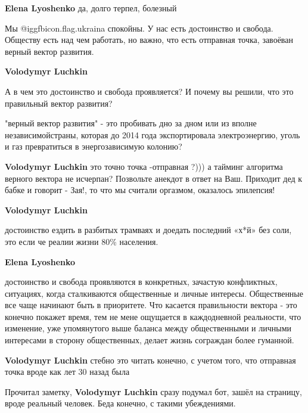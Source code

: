 \begin{itemize}
\begin{itemize}
\textbf{Elena Lyoshenko} да, долго терпел, болезный
\end{itemize} %


Мы @igg{fbicon.flag.ukraina} спокойны. У нас есть достоинство и свобода. Обществу есть над чем
работать, но важно, что есть отправная точка, завоёван верный вектор развития.

\begin{itemize} %

\textbf{Volodymyr Luchkin}

А в чем это достоинство и свобода проявляется? И почему вы решили, что это
правильный вектор развития?


"верный вектор развития" - это пробивать дно за дном или из вполне
независимойстраны, которая до 2014 года экспортировала электроэнергию, уголь и
газ превратиться в энергозависимую колонию?

\textbf{Volodymyr Luchkin} это точно точка -отправная ?))) а тайминг алгоритма верного вектора не исчерпан?
Позвольте анекдот в ответ на Ваш.
Приходит дед к бабке и говорит - Зая!, то что мы считали оргазмом, оказалось эпилепсия!

\textbf{Volodymyr Luchkin} 

достоинство ездить в разбитых трамваях и доедать последний «х*й» без соли, это
если че реалии жизни 80\% населения.

\textbf{Elena Lyoshenko} 

достоинство и свобода проявляются в конкретных, зачастую конфликтных,
ситуациях, когда сталкиваются общественные и личные интересы. Общественные все
чаще начинают быть в приоритете. Что касается правильности вектора - это
конечно покажет время, тем не мене ощущается в каждодневной реальности, что
изменение, уже упомянутого выше баланса между общественными и личными
интересами в сторону общественных, делает жизнь сограждан более гуманной.

\textbf{Volodymyr Luchkin} стебно это читать конечно, с учетом того, что отправная точка вроде как лет 30 назад была


Прочитал заметку, \textbf{Volodymyr Luchkin} сразу подумал бот, зашёл на страницу, вроде
реальный человек. Беда конечно, с такими убеждениями.



\end{itemize}
\end{itemize}
